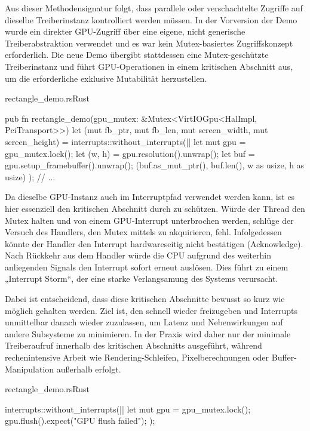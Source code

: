 Aus dieser Methodensignatur folgt, dass parallele oder verschachtelte Zugriffe auf dieselbe Treiberinstanz kontrolliert werden müssen. In der Vorversion der Demo wurde ein direkter GPU-Zugriff über eine eigene, nicht generische Treiberabstraktion verwendet und es war kein Mutex-basiertes Zugriffskonzept erforderlich. Die neue Demo übergibt stattdessen eine Mutex-geschützte Treiberinstanz und führt GPU-Operationen in einem kritischen Abschnitt aus, um die erforderliche exklusive Mutabilität herzustellen.

\begin{codeblock}{rectangle\_demo.rs}{Rust}
  \begin{rustcode}
pub fn rectangle_demo(gpu_mutex: &Mutex<VirtIOGpu<HalImpl, PciTransport>>) {
    let (mut fb_ptr, mut fb_len, mut screen_width, mut screen_height) =
        interrupts::without_interrupts(|| {
            let mut gpu = gpu_mutex.lock();
            let (w, h) = gpu.resolution().unwrap();
            let buf = gpu.setup_framebuffer().unwrap();
            (buf.as_mut_ptr(), buf.len(), w as usize, h as usize)
        });
    // ...
}
  \end{rustcode}
\end{codeblock}

Da dieselbe GPU-Instanz auch im Interruptpfad verwendet werden kann, ist es hier essenziell den kritischen Abschnitt durch  zu schützen. Würde der Thread den Mutex halten und von einem GPU-Interrupt unterbrochen werden, schlüge der Versuch des Handlers, den Mutex mittels  zu akquirieren, fehl. Infolgedessen könnte der Handler den Interrupt hardwareseitig nicht bestätigen (Acknowledge). Nach Rückkehr aus dem Handler würde die CPU aufgrund des weiterhin anliegenden Signals den Interrupt sofort erneut auslösen. Dies führt zu einem „Interrupt Storm“, der eine starke Verlangsamung des Systems verursacht.

Dabei ist entscheidend, dass diese kritischen Abschnitte bewusst so kurz wie möglich gehalten werden. Ziel ist, den  schnell wieder freizugeben und Interrupts unmittelbar danach wieder zuzulassen, um Latenz und Nebenwirkungen auf andere Subsysteme zu minimieren. In der Praxis wird daher nur der minimale Treiberaufruf innerhalb des kritischen Abschnitts ausgeführt, während rechenintensive Arbeit wie Rendering-Schleifen, Pixelberechnungen oder Buffer-Manipulation außerhalb erfolgt.

\begin{codeblock}{rectangle\_demo.rs}{Rust}
  \begin{rustcode}
interrupts::without_interrupts(|| {
    let mut gpu = gpu_mutex.lock();
    gpu.flush().expect("GPU flush failed");
});
  \end{rustcode}
\end{codeblock}

